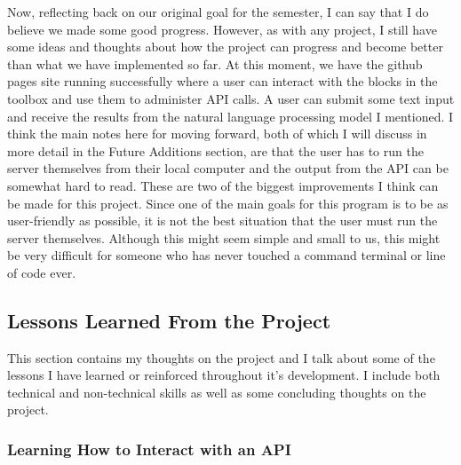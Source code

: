 \documentclass{article}
\theoremstyle{theorem}
\theoremstyle{definition}
\theoremstyle{remark}
\begin{document}
Now, reflecting back on our original goal for the semester, I can say that I do believe we made some good progress. However, as with any project, I still have some ideas and thoughts about how the project can progress and become better than what we have implemented so far. At this moment, we have 
the github pages site running successfully where a user can interact with the blocks in the toolbox and use them to administer API calls. A user can submit some text input and receive the results from the natural language processing model I mentioned. I think the main notes here for moving forward, both of 
which I will discuss in more detail in the Future Additions section, are that the user has to run the server themselves from their local computer and the output from the API can be somewhat hard to read. These are two of the biggest improvements I think can be made for this project. Since one of the main 
goals for this program is to be as user-friendly as possible, it is not the best situation that the user must run the server themselves. Although this might seem simple and small to us, this might be very difficult for someone who has never touched a command terminal or line of code ever. \\


\subsection{Lessons Learned From the Project} 

This section contains my thoughts on the project and I talk about some of the lessons I have learned or reinforced throughout it's development. I include both technical and non-technical skills as well as some concluding thoughts on the project. \\
 
\subsubsection{Learning How to Interact with an API}
\end{document}
